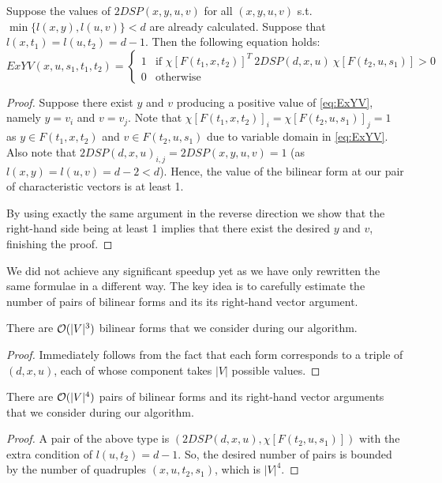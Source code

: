 \begin{proposition}
Suppose the values of $2DSP(x, y, u, v)$ for all $(x, y, u, v)$ s.t. $\min\{l(x, y), l(u, v)\} < d$ are already calculated. Suppose that $l(x, t_1) = l(u, t_2) = d - 1$. Then the following equation holds:
\begin{equation}
\label{eq:ExYVbil}
ExYV(x, u, s_1, t_1, t_2) = \begin{cases}
     1 & \text{if } \chi[F(t_1, x, t_2)]^T~2DSP(d,x,u)~\chi[F(t_2, u, s_1)] > 0 \\
     0 & \text{otherwise}
\end{cases}
\end{equation}
\end{proposition}
\begin{proof}
Suppose there exist $y$ and $v$ producing a positive value of \eqref{eq:ExYV}, namely $y = v_i$ and $v = v_j$. Note that $\chi[F(t_1, x, t_2)]_i = \chi[F(t_2, u, s_1)]_j = 1$ as $y \in F(t_1, x, t_2)$ and $v \in F(t_2, u, s_1)$ due to variable domain in \eqref{eq:ExYV}. Also note that $2DSP(d, x, u)_{i,j} = 2DSP(x, y, u, v) = 1$ (as $l(x, y) = l(u, v) = d - 2 < d$). Hence, the value of the bilinear form at our pair of characteristic vectors is at least 1.

By using exactly the same argument in the reverse direction we show that the right-hand side being at least 1 implies that there exist the desired $y$ and $v$, finishing the proof. 
\end{proof}

We did not achieve any significant speedup yet as we have only rewritten the same formulae in a different way. The key idea is to carefully estimate the number of pairs of bilinear forms and its its right-hand vector argument. 

\begin{proposition}
There are $\mathcal{O}(|V|^3)$ bilinear forms that we consider during our algorithm.
\end{proposition}
\begin{proof}
Immediately follows from the fact that each form corresponds to a triple of $(d, x, u)$, each of whose component takes $|V|$ possible values.
\end{proof}

\begin{proposition}
There are $\mathcal{O}(|V|^4)$ pairs of bilinear forms and its right-hand vector arguments that we consider during our algorithm.
\end{proposition}
\begin{proof}
A pair of the above type is $(2DSP(d, x, u), \chi[F(t_2, u, s_1)])$ with the extra condition of $l(u, t_2) = d - 1$. So, the desired number of pairs is bounded by the number of quadruples $(x, u, t_2, s_1)$, which is $|V|^4$.
\end{proof}


